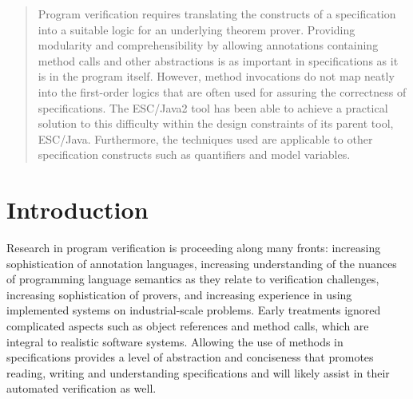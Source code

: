 \documentclass{sig-alternate}
\newif\ifpdf
\begin{document}


\date{27 March 2004}

\newcommand{\myhref}[2]{\ifpdf\href{#1}{#2}\else\htmladdnormallinkfoot{#2}{#1}\fi}

\maketitle
\begin{abstract}
Program verification requires translating the constructs of a specification 
into a suitable logic for an underlying theorem prover.   Providing modularity
and comprehensibility by allowing 
annotations containing method calls and other abstractions is as important in 
specifications as it is in the program itself.  However, method invocations do not
map neatly into the first-order logics that are often used for assuring the correctness
of specifications.  The ESC/Java2 tool
has been able to achieve a practical solution to this difficulty within the design constraints
of its parent tool, ESC/Java.  Furthermore, the techniques used are applicable to other
specification constructs such as quantifiers and model variables.

\end{abstract}




\section{Introduction}

Research in program verification is proceeding along many fronts: 
increasing sophistication of annotation languages, increasing
understanding of the nuances of programming language semantics as they
relate to verification challenges, increasing sophistication of 
provers, and increasing experience in using implemented systems on
industrial-scale problems.  Early treatments ignored complicated
aspects such as object references and method calls, which are
integral to realistic software systems.  Allowing
the use of methods in specifications provides a level of abstraction 
and conciseness that
promotes reading, writing and understanding specifications and will 
likely assist in their automated verification as well.  
\end{document}
